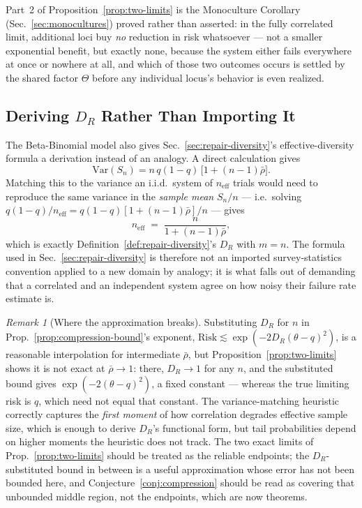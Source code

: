\documentclass[11pt,a4paper]{article}
\theoremstyle{plain}
\theoremstyle{definition}
\theoremstyle{remark}
\newtheorem{remark}[theorem]{Remark}
\newcommand{\DR}{D_R}
\begin{document}
Part~2 of Proposition~\ref{prop:two-limits} is the Monoculture Corollary (Sec.~\ref{sec:monocultures}) proved rather than asserted: in the fully correlated limit, additional loci buy \emph{no} reduction in risk whatsoever — not a smaller exponential benefit, but exactly none, because the system either fails everywhere at once or nowhere at all, and which of those two outcomes occurs is settled by the shared factor $\Theta$ before any individual locus's behavior is even realized.

\subsection{Deriving $\DR$ Rather Than Importing It}
\label{subsec:deriving-dr}

The Beta-Binomial model also gives Sec.~\ref{sec:repair-diversity}'s effective-diversity formula a derivation instead of an analogy. A direct calculation gives
\[
\mathrm{Var}(S_n) = n\,q(1-q)\,\big[1+(n-1)\bar\rho\big].
\]
Matching this to the variance an i.i.d.\ system of $n_{\mathrm{eff}}$ trials would need to reproduce the same variance in the \emph{sample mean} $S_n/n$ — i.e.\ solving $q(1-q)/n_{\mathrm{eff}} = q(1-q)[1+(n-1)\bar\rho]/n$ — gives
\[
n_{\mathrm{eff}} \;=\; \frac{n}{1+(n-1)\bar\rho},
\]
which is exactly Definition~\ref{def:repair-diversity}'s $\DR$ with $m=n$. The formula used in Sec.~\ref{sec:repair-diversity} is therefore not an imported survey-statistics convention applied to a new domain by analogy; it is what falls out of demanding that a correlated and an independent system agree on how noisy their failure rate estimate is.

\begin{remark}[Where the approximation breaks]
\label{rem:heuristic-limits}
Substituting $\DR$ for $n$ in Prop.~\ref{prop:compression-bound}'s exponent, $\mathrm{Risk} \lesssim \exp(-2\DR(\theta-q)^2)$, is a reasonable interpolation for intermediate $\bar\rho$, but Proposition~\ref{prop:two-limits} shows it is not exact at $\bar\rho\to1$: there, $\DR\to1$ for any $n$, and the substituted bound gives $\exp(-2(\theta-q)^2)$, a fixed constant — whereas the true limiting risk is $q$, which need not equal that constant. The variance-matching heuristic correctly captures the \emph{first moment} of how correlation degrades effective sample size, which is enough to derive $\DR$'s functional form, but tail probabilities depend on higher moments the heuristic does not track. The two exact limits of Prop.~\ref{prop:two-limits} should be treated as the reliable endpoints; the $\DR$-substituted bound in between is a useful approximation whose error has not been bounded here, and Conjecture~\ref{conj:compression} should be read as covering that unbounded middle region, not the endpoints, which are now theorems.
\end{remark}
\end{document}
